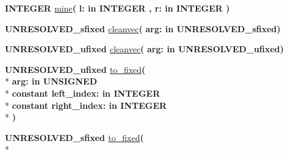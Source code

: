\begin{DoxyCompactItemize}
\item 
{\bfseries {\bfseries \textcolor{comment}{I\+N\+T\+E\+G\+E\+R}\textcolor{vhdlchar}{ }}} \hyperlink{class__fixed__pkg_a5e1c190d6749e2180bef253bc1e4a32f}{mine}{\bfseries  ( }{\bfseries \textcolor{vhdlchar}{l\+: }\textcolor{stringliteral}{in }{\bfseries \textcolor{comment}{I\+N\+T\+E\+G\+E\+R}\textcolor{vhdlchar}{ }}}{\bfseries  , \textcolor{vhdlchar}{r\+: }\textcolor{stringliteral}{in }{\bfseries \textcolor{comment}{I\+N\+T\+E\+G\+E\+R}\textcolor{vhdlchar}{ }}}{\bfseries  )} 
\item 
{\bfseries {\bfseries \textcolor{vhdlchar}{U\+N\+R\+E\+S\+O\+L\+V\+E\+D\+\_\+sfixed}\textcolor{vhdlchar}{ }}} \hyperlink{class__fixed__pkg_a73cce8d9734f7c1f1e65196d94d72cd6}{cleanvec}{\bfseries  ( }{\bfseries \textcolor{vhdlchar}{arg\+: }\textcolor{stringliteral}{in }\textcolor{vhdlchar}{U\+N\+R\+E\+S\+O\+L\+V\+E\+D\+\_\+sfixed}}{\bfseries  )} 
\item 
{\bfseries {\bfseries \textcolor{vhdlchar}{U\+N\+R\+E\+S\+O\+L\+V\+E\+D\+\_\+ufixed}\textcolor{vhdlchar}{ }}} \hyperlink{class__fixed__pkg_a99671cfb40eb849a416fcdbc62c7fe11}{cleanvec}{\bfseries  ( }{\bfseries \textcolor{vhdlchar}{arg\+: }\textcolor{stringliteral}{in }\textcolor{vhdlchar}{U\+N\+R\+E\+S\+O\+L\+V\+E\+D\+\_\+ufixed}}{\bfseries  )} 
\item 
{\bfseries {\bfseries \textcolor{vhdlchar}{U\+N\+R\+E\+S\+O\+L\+V\+E\+D\+\_\+ufixed}\textcolor{vhdlchar}{ }}} \hyperlink{class__fixed__pkg_a8866c9b8045ad92e0bbae719bba44ce2}{to\+\_\+fixed}{\bfseries  ( }\\*
{\bfseries \textcolor{vhdlchar}{arg\+: }\textcolor{stringliteral}{in }{\bfseries \textcolor{comment}{U\+N\+S\+I\+G\+N\+E\+D}\textcolor{vhdlchar}{ }}}\\*
{\bfseries {\bfseries \textcolor{keywordflow}{constant}\textcolor{vhdlchar}{ }}\textcolor{vhdlchar}{left\+\_\+index\+: }\textcolor{stringliteral}{in }{\bfseries \textcolor{comment}{I\+N\+T\+E\+G\+E\+R}\textcolor{vhdlchar}{ }}}\\*
{\bfseries {\bfseries \textcolor{keywordflow}{constant}\textcolor{vhdlchar}{ }}\textcolor{vhdlchar}{right\+\_\+index\+: }\textcolor{stringliteral}{in }{\bfseries \textcolor{comment}{I\+N\+T\+E\+G\+E\+R}\textcolor{vhdlchar}{ }}}\\*
{\bfseries  )} 
\item 
{\bfseries {\bfseries \textcolor{vhdlchar}{U\+N\+R\+E\+S\+O\+L\+V\+E\+D\+\_\+sfixed}\textcolor{vhdlchar}{ }}} \hyperlink{class__fixed__pkg_ad338e43900f64485b3705abccd15d090}{to\+\_\+fixed}{\bfseries  ( }\\*

\end{DoxyCompactItemize}
